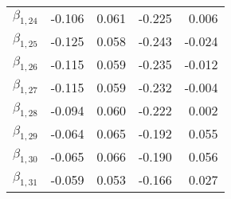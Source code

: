 \begin{tabular}{lrrrr}
$\beta_{1,24}$ & -0.106 &     0.061 &   -0.225 &     0.006 \\
$\beta_{1,25}$ & -0.125 &     0.058 &   -0.243 &    -0.024 \\
$\beta_{1,26}$ & -0.115 &     0.059 &   -0.235 &    -0.012 \\
$\beta_{1,27}$ & -0.115 &     0.059 &   -0.232 &    -0.004 \\
$\beta_{1,28}$ & -0.094 &     0.060 &   -0.222 &     0.002 \\
$\beta_{1,29}$ & -0.064 &     0.065 &   -0.192 &     0.055 \\
$\beta_{1,30}$ & -0.065 &     0.066 &   -0.190 &     0.056 \\
$\beta_{1,31}$ & -0.059 &     0.053 &   -0.166 &     0.027 \\
\bottomrule
\end{tabular}
